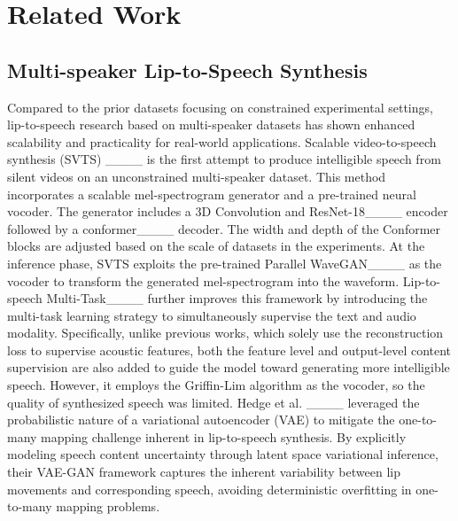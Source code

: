 \section{Related Work}
\subsection{Multi-speaker Lip-to-Speech Synthesis}
Compared to the prior datasets focusing on constrained experimental settings, lip-to-speech research based on multi-speaker datasets has shown enhanced scalability and practicality for real-world applications. Scalable video-to-speech synthesis (SVTS) ____ is the first attempt to produce intelligible speech from silent videos on an unconstrained multi-speaker dataset. This method incorporates a scalable mel-spectrogram generator and a pre-trained neural vocoder. The generator includes a 3D Convolution and ResNet-18____ encoder followed by a conformer____ decoder. The width and depth of the Conformer blocks are adjusted based on the scale of datasets in the experiments. At the inference phase, SVTS exploits the pre-trained Parallel WaveGAN____ as the vocoder to transform the generated mel-spectrogram into the waveform. Lip-to-speech Multi-Task____ further improves this framework by introducing the multi-task learning strategy to simultaneously supervise the text and audio modality. Specifically, unlike previous works, which solely use the reconstruction loss to supervise acoustic features, both the feature level and output-level content supervision are also added to guide the model toward generating more intelligible speech. However, it employs the Griffin-Lim algorithm as the vocoder, so the quality of synthesized speech was limited. Hedge et al. ____ leveraged the probabilistic nature of a variational autoencoder (VAE) to mitigate the one-to-many mapping challenge inherent in lip-to-speech synthesis. By explicitly modeling speech content uncertainty through latent space variational inference, their VAE-GAN framework captures the inherent variability between lip movements and corresponding speech, avoiding deterministic overfitting in one-to-many mapping problems.

